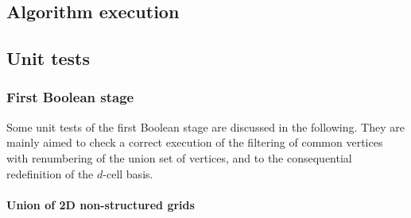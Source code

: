 \documentclass[11pt,oneside]{article}	%
\begin{document}
\subsection{Algorithm execution}
\subsection{Unit tests}

\subsubsection{First Boolean stage}

Some unit tests of the first Boolean stage are discussed in the following. They are mainly aimed to check a correct execution of the filtering of common vertices with renumbering of the union set of vertices, and to the consequential redefinition of the $d$-cell basis.

\paragraph{Union of 2D non-structured grids}
\end{document}
